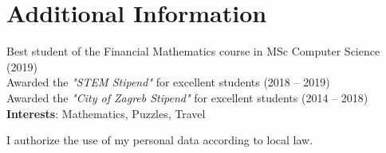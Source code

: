 \documentclass[letterpaper,11pt]{article}
\begin{document}


\section{Additional Information}
\begin{itemize}[leftmargin=0.15in, label={}]
  \small{\item{
     Best student of the Financial Mathematics course in MSc Computer Science (2019) \\
     Awarded the \textit{"STEM Stipend"} for excellent students (2018 -- 2019) \\
     Awarded the \textit{"City of Zagreb Stipend"} for excellent students (2014 -- 2018) \\ \vspace{3pt}
     \textbf{Interests}: Mathematics, Puzzles, Travel
    }}
\end{itemize}

\mbox{}
\vfill
I authorize the use of my personal data according to local law.


\end{document}
